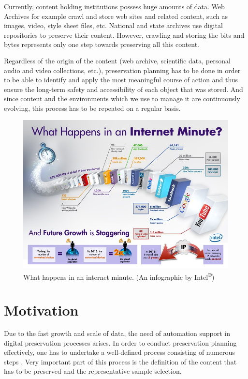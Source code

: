 Currently, content holding institutions possess huge amounts of data. Web Archives for example crawl and store web sites and related content, such as images, video, style sheet files, etc. National and state archives use digital repositories to preserve their content. However, crawling and storing the bits and bytes represents only one step towards preserving all this content.

Regardless of the origin of the content (web archive, scientific data, personal audio and video collections, etc.), preservation planning has to be done in order to be able to identify and apply the most meaningful course of action and thus ensure the long-term safety and accessibility of each object that was stored. And since content and the environments which we use to manage it are continuously evolving, this process has to be repeated on a regular basis.

\begin{figure}[hb]
\begin{center}
\includegraphics[width=6in]{figures/introduction/intel_oneminute_internet.jpg}
\caption{What happens in an internet minute. (An infographic by Intel\textsuperscript{\copyright})}
\label{fig:intel_oneminute_internet}
\end{center}
\end{figure}

\section{Motivation}
\label{sec:motivation}
Due to the fast growth and scale of data, the need of automation support in digital preservation processes arises. In order to conduct preservation planning effectively, one has to undertake a well-defined process consisting of numerous steps \cite{Becker:2009fk}. Very important part of this process is the definition of the content that has to be preserved and the representative sample selection. 

